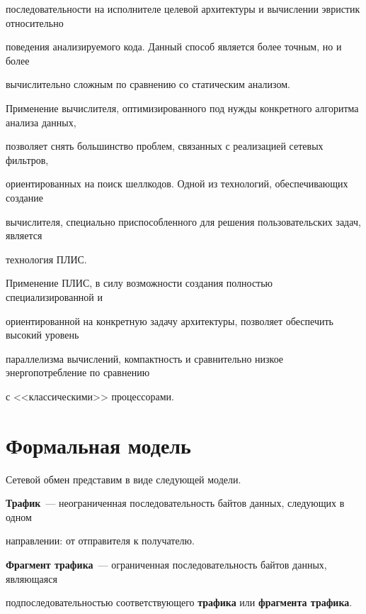 последовательности на исполнителе целевой архитектуры и вычислении эвристик относительно 


поведения анализируемого кода. Данный способ является более точным, но и более 


вычислительно сложным по сравнению со статическим анализом.





Применение вычислителя, оптимизированного под нужды конкретного алгоритма анализа данных, 


позволяет снять большинство проблем, связанных с реализацией сетевых фильтров, 


ориентированных на поиск шеллкодов. Одной из технологий, обеспечивающих создание 


вычислителя, специально при\-спо\-соб\-лен\-но\-го для решения пользовательских задач, является 


технология ПЛИС.





Применение ПЛИС, в силу возможности создания полностью специализированной и 


ориентированной на конкретную задачу архитектуры, позволяет обеспечить высокий уровень 


параллелизма вычислений, компактность и сравнительно низкое энергопотребление по сравнению 


с <<классическими>> процессорами.





\section{Формальная модель}





Сетевой обмен представим в виде следующей модели.





\textbf{Трафик}~--- неограниченная последовательность байтов данных, следующих в одном 


направлении: от отправителя к получателю.





\textbf{Фрагмент трафика}~--- ограниченная последовательность байтов данных, являющаяся 


подпоследовательностью соответствующего \textbf{трафика} или \textbf{фрагмента трафика}.






